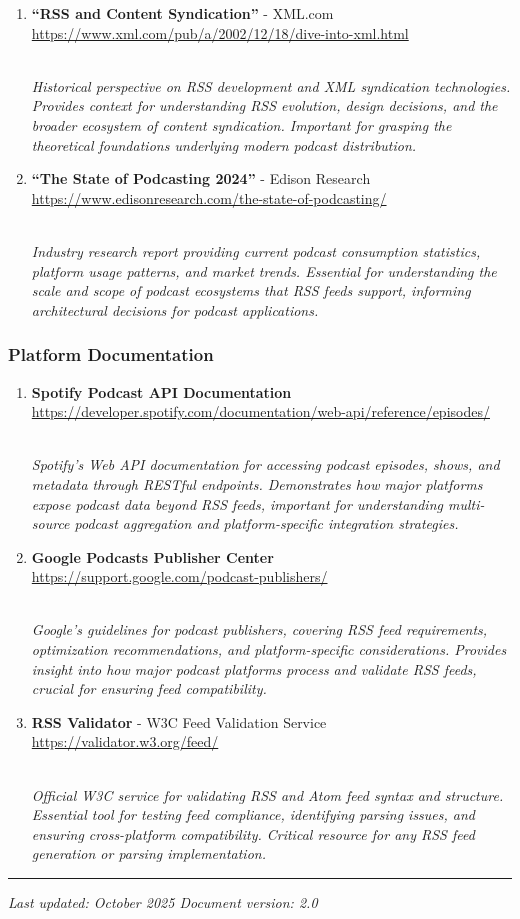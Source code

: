 \documentclass[
  letterpaper,
  DIV=11,
  numbers=noendperiod]{scrartcl}
\begin{document}
\begin{enumerate}
\def\labelenumi{\arabic{enumi}.}
\setcounter{enumi}{10}
\item
  \textbf{``RSS and Content Syndication''} - XML.com\\
  \url{https://www.xml.com/pub/a/2002/12/18/dive-into-xml.html}\strut \\
  \emph{Historical perspective on RSS development and XML syndication
  technologies. Provides context for understanding RSS evolution, design
  decisions, and the broader ecosystem of content syndication. Important
  for grasping the theoretical foundations underlying modern podcast
  distribution.}
\item
  \textbf{``The State of Podcasting 2024''} - Edison Research\\
  \url{https://www.edisonresearch.com/the-state-of-podcasting/}\strut \\
  \emph{Industry research report providing current podcast consumption
  statistics, platform usage patterns, and market trends. Essential for
  understanding the scale and scope of podcast ecosystems that RSS feeds
  support, informing architectural decisions for podcast applications.}
\end{enumerate}

\subsubsection{Platform Documentation}\label{platform-documentation}

\begin{enumerate}
\def\labelenumi{\arabic{enumi}.}
\setcounter{enumi}{12}
\item
  \textbf{Spotify Podcast API Documentation}\\
  \url{https://developer.spotify.com/documentation/web-api/reference/episodes/}\strut \\
  \emph{Spotify's Web API documentation for accessing podcast episodes,
  shows, and metadata through RESTful endpoints. Demonstrates how major
  platforms expose podcast data beyond RSS feeds, important for
  understanding multi-source podcast aggregation and platform-specific
  integration strategies.}
\item
  \textbf{Google Podcasts Publisher Center}\\
  \url{https://support.google.com/podcast-publishers/}\strut \\
  \emph{Google's guidelines for podcast publishers, covering RSS feed
  requirements, optimization recommendations, and platform-specific
  considerations. Provides insight into how major podcast platforms
  process and validate RSS feeds, crucial for ensuring feed
  compatibility.}
\item
  \textbf{RSS Validator} - W3C Feed Validation Service\\
  \url{https://validator.w3.org/feed/}\strut \\
  \emph{Official W3C service for validating RSS and Atom feed syntax and
  structure. Essential tool for testing feed compliance, identifying
  parsing issues, and ensuring cross-platform compatibility. Critical
  resource for any RSS feed generation or parsing implementation.}
\end{enumerate}

\begin{center}\rule{0.5\linewidth}{0.5pt}\end{center}

\emph{Last updated: October 2025 \textbar{} Document version: 2.0}
\end{document}
